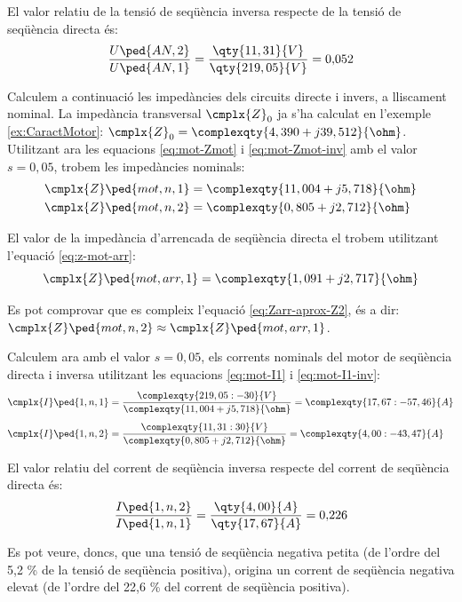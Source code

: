 \begin{exemple}
	El valor relatiu de la tensió de seqüència inversa respecte de la tensió de seqüència directa és:
	\[
		\frac{U\ped{AN,2}}{U\ped{AN,1}} = \frac{\qty{11,31}{V}}{\qty{219,05}{V}} = 0{,}052
	\]
	
	Calculem a continuació les impedàncies dels circuits directe i invers, a lliscament nominal. La impedància transversal $\cmplx{Z}_0$ ja s'ha calculat en l'exemple \ref{ex:CaractMotor}: $ \cmplx{Z}_0 =  \complexqty{4,390+j39,512}{\ohm} $. Utilitzant ara les equacions \eqref{eq:mot-Zmot} i \eqref{eq:mot-Zmot-inv} amb el valor $s=0{,}05$, trobem les impedàncies nominals:
	\begin{align*}
		\cmplx{Z}\ped{mot,n,1} &= \complexqty{11,004+j5,718}{\ohm} \\
		\cmplx{Z}\ped{mot,n,2} &= \complexqty{0,805+j2,712}{\ohm}
	\end{align*}
	
	El valor de la impedància d'arrencada de seqüència directa el trobem utilitzant l'equació \eqref{eq:z-mot-arr}:
	\[
		\cmplx{Z}\ped{mot,arr,1} = \complexqty{1,091+j2,717}{\ohm}
	\]
	
	Es pot comprovar que es compleix l'equació \eqref{eq:Zarr-aprox-Z2}, és a dir: $\cmplx{Z}\ped{mot,n,2} \approx \cmplx{Z}\ped{mot,arr,1}$.
	
	Calculem ara amb el valor $s=0{,}05$, els corrents nominals del motor de seqüència directa i inversa utilitzant les equacions \eqref{eq:mot-I1} i \eqref{eq:mot-I1-inv}:
	\begin{align*}
		\cmplx{I}\ped{1,n,1} &=  \frac{\complexqty{219,05:-30}{V}}{\complexqty{11,004+j5,718}{\ohm}} = \complexqty{17,67:-57,46}{A} \\[1ex] 
		\cmplx{I}\ped{1,n,2} &= \frac{\complexqty{11,31:30}{V}}{\complexqty{0,805+j2,712}{\ohm}} = \complexqty{4,00:-43,47}{A}
	\end{align*}
	
	El valor relatiu del corrent de seqüència inversa respecte del corrent de seqüència directa és:
	\[
		\frac{I\ped{1,n,2}}{I\ped{1,n,1}} = \frac{\qty{4,00}{A}}{\qty{17,67}{A}} = 0{,}226
	\]	
	
	Es pot veure, doncs, que una tensió de seqüència negativa petita (de l'ordre del 5,2 \% de la tensió de seqüència positiva), origina un corrent de seqüència negativa elevat (de l'ordre del 22,6 \% del corrent de seqüència positiva). 
	

\end{exemple}
